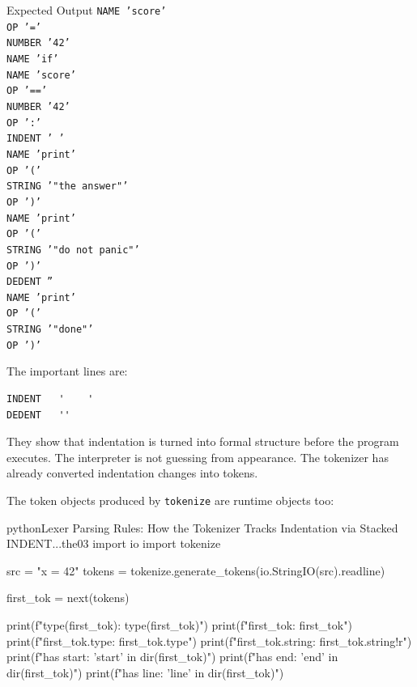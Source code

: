 \documentclass[a4paper,twoside]{report}
\begin{document}
\begin{iobox}{Expected Output}
\texttt{NAME     'score'} \\
\texttt{OP       '='} \\
\texttt{NUMBER   '42'} \\
\texttt{NAME     'if'} \\
\texttt{NAME     'score'} \\
\texttt{OP       '=='} \\
\texttt{NUMBER   '42'} \\
\texttt{OP       ':'} \\
\texttt{INDENT   '    '} \\
\texttt{NAME     'print'} \\
\texttt{OP       '('} \\
\texttt{STRING   '"the answer"'} \\
\texttt{OP       ')'} \\
\texttt{NAME     'print'} \\
\texttt{OP       '('} \\
\texttt{STRING   '"do not panic"'} \\
\texttt{OP       ')'} \\
\texttt{DEDENT   ''} \\
\texttt{NAME     'print'} \\
\texttt{OP       '('} \\
\texttt{STRING   '"done"'} \\
\texttt{OP       ')'} \\
\end{iobox}


The important lines are:

\begin{verbatim}
INDENT   '    '
DEDENT   ''
\end{verbatim}

They show that indentation is turned into formal structure before the program executes. The interpreter is not guessing from appearance. The tokenizer has already converted indentation changes into tokens.

The token objects produced by \texttt{tokenize} are runtime objects too:

\begin{codebox}[]{python}{Lexer Parsing Rules: How the Tokenizer Tracks Indentation via Stacked INDENT...}{the03}
import io
import tokenize

src = "x = 42\n"
tokens = tokenize.generate_tokens(io.StringIO(src).readline)

first_tok = next(tokens)

print(f"type(first_tok): {type(first_tok)}")
print(f"first_tok: {first_tok}")
print(f"first_tok.type: {first_tok.type}")
print(f"first_tok.string: {first_tok.string!r}")
print(f"has start: {'start' in dir(first_tok)}")
print(f"has end: {'end' in dir(first_tok)}")
print(f"has line: {'line' in dir(first_tok)}")
\end{codebox}
\end{document}
